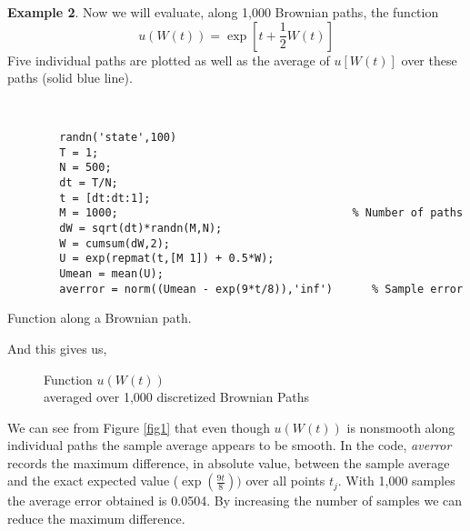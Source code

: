 \documentclass[12pt,a4paper]{article}
\begin{document}
\noindent  \textbf{Example 2}. Now we will evaluate, along 1,000 Brownian paths, the function 
\begin{equation} \label{eq:2}
u\left(W(t)\right)=\exp\left[t+\frac{1}{2}W(t)\right] 
\end{equation}
Five individual paths are plotted as well as the average of $u\left[W(t)\right]$ over these paths (solid blue line). 
\begin{program}
\begin{scriptsize}
				\begin{verbatim}
				
				
        randn('state',100)                      
        T = 1;
        N = 500; 
        dt = T/N; 
        t = [dt:dt:1];
        M = 1000;                                    % Number of paths 
        dW = sqrt(dt)*randn(M,N);                            
        W = cumsum(dW,2);                                
        U = exp(repmat(t,[M 1]) + 0.5*W);
        Umean = mean(U);
        averror = norm((Umean - exp(9*t/8)),'inf')      % Sample error
				\end{verbatim}
\end{scriptsize}
  \caption{Function along a Brownian path.}
\end{program}
\noindent And this gives us, 
\begin{figure}[H]
\caption{Function $u\left(W(t)\right)$ \\ 
averaged over 1,000 discretized Brownian Paths}  \label{fig1a}
\begin{center}
\end{center}
\end{figure}
\noindent We can see from Figure \ref{fig1} that even though $u\left(W(t)\right)$ is nonsmooth along individual paths the sample average appears to be smooth. In the code, \textsl{averror} records the maximum difference, in absolute value, between the sample average and the exact expected value ($\exp(\frac{9t}{8}))$ over all points $t_j$. With 1,000 samples the average error obtained is 0.0504. By increasing the number of samples we can reduce the maximum difference. 
\end{document}
